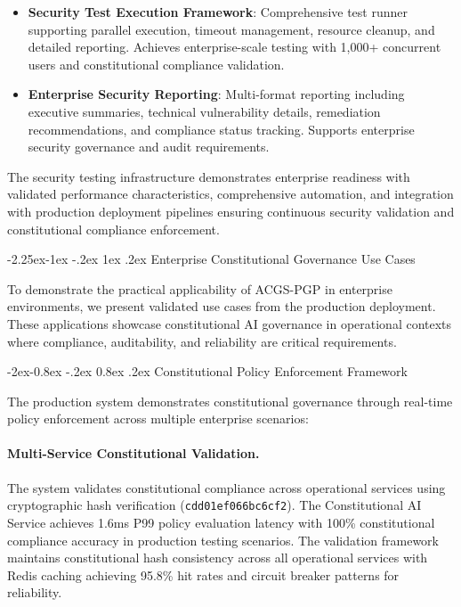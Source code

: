 \documentclass[manuscript,screen,9pt]{acmart}
\makeatletter
\renewcommand\subsection{\@startsection{subsection}{2}{\z@}%
  {-2.25ex\@plus -1ex \@minus -.2ex}%
  {1ex \@plus .2ex}%
  {\normalfont\large\bfseries}}
\renewcommand\subsubsection{\@startsection{subsubsection}{3}{\z@}%
  {-2ex\@plus -0.8ex \@minus -.2ex}%
  {0.8ex \@plus .2ex}%
  {\normalfont\normalsize\bfseries}}
\makeatother
\begin{document}
\begin{table}[!htb]
\begin{itemize}[leftmargin=*,itemsep=2pt,parsep=1pt]
    \item \textbf{Security Test Execution Framework}: Comprehensive test runner supporting parallel execution, timeout management, resource cleanup, and detailed reporting. Achieves enterprise-scale testing with 1,000+ concurrent users and constitutional compliance validation.

    \item \textbf{Enterprise Security Reporting}: Multi-format reporting including executive summaries, technical vulnerability details, remediation recommendations, and compliance status tracking. Supports enterprise security governance and audit requirements.
\end{itemize}

The security testing infrastructure demonstrates enterprise readiness with validated performance characteristics, comprehensive automation, and integration with production deployment pipelines ensuring continuous security validation and constitutional compliance enforcement.

\subsection{Enterprise Constitutional Governance Use Cases}
\label{subsec:enterprise_use_cases}

To demonstrate the practical applicability of ACGS-PGP in enterprise environments, we present validated use cases from the production deployment. These applications showcase constitutional AI governance in operational contexts where compliance, auditability, and reliability are critical requirements.

\subsubsection{Constitutional Policy Enforcement Framework}
\label{subsubsec:policy_enforcement_framework}

The production system demonstrates constitutional governance through real-time policy enforcement across multiple enterprise scenarios:

\paragraph{Multi-Service Constitutional Validation.} The system validates constitutional compliance across operational services using cryptographic hash verification (\texttt{cdd01ef066bc6cf2}). The Constitutional AI Service achieves 1.6ms P99 policy evaluation latency with 100\% constitutional compliance accuracy in production testing scenarios. The validation framework maintains constitutional hash consistency across all operational services with Redis caching achieving 95.8\% hit rates and circuit breaker patterns for reliability.


\end{table}
\end{document}
